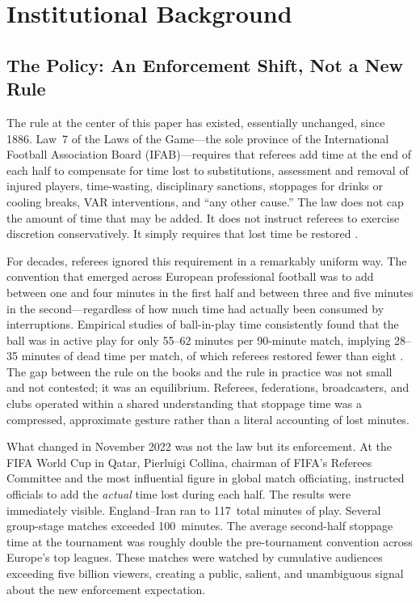 
\section{Institutional Background}
\label{sec:background}


\subsection{The Policy: An Enforcement Shift, Not a New Rule}
\label{sec:background:policy}

The rule at the center of this paper has existed, essentially unchanged,
since 1886. Law~7 of the Laws of the Game---the sole province of the
International Football Association Board (IFAB)---requires that referees
add time at the end of each half to compensate for time lost to
substitutions, assessment and removal of injured players, time-wasting,
disciplinary sanctions, stoppages for drinks or cooling breaks, VAR
interventions, and ``any other cause.'' The law does not cap the amount
of time that may be added. It does not instruct referees to exercise
discretion conservatively. It simply requires that lost time be
restored \citep{ifab2023laws}.

For decades, referees ignored this requirement in a remarkably uniform
way. The convention that emerged across European professional football
was to add between one and four minutes in the first half and between
three and five minutes in the second---regardless of how much time had
actually been consumed by interruptions. Empirical studies of ball-in-play
time consistently found that the ball was in active play for only 55--62
minutes per 90-minute match, implying 28--35 minutes of dead time per
match, of which referees restored fewer than eight
\citep{lames2024goal, wei2024goal}.
The gap between the rule on the books and the rule in practice was not
small and not contested; it was an equilibrium. Referees, federations,
broadcasters, and clubs operated within a shared understanding that
stoppage time was a compressed, approximate gesture rather than a literal
accounting of lost minutes.

What changed in November 2022 was not the law but its enforcement.
At the FIFA World Cup in Qatar, Pierluigi Collina, chairman of FIFA's
Referees Committee and the most influential figure in global match
officiating, instructed officials to add the \textit{actual} time lost
during each half. The results were immediately visible. England--Iran
ran to 117~total minutes of play. Several group-stage matches exceeded
100~minutes. The average second-half stoppage time at the tournament was
roughly double the pre-tournament convention across Europe's top leagues.
These matches were watched by cumulative audiences exceeding five billion
viewers, creating a public, salient, and unambiguous signal about the new
enforcement expectation.

